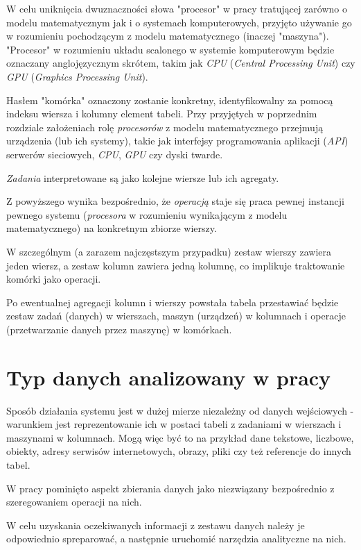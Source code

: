 \documentclass[brudnopis]{xmgr}
\begin{document}
W celu uniknięcia dwuznaczności słowa "procesor" w pracy tratującej zarówno o modelu matematycznym jak i o systemach komputerowych, przyjęto używanie go w rozumieniu pochodzącym z modelu matematycznego (inaczej "maszyna").
"Procesor" w rozumieniu układu scalonego w systemie komputerowym będzie oznaczany anglojęzycznym skrótem, takim jak \emph{CPU} (\emph{Central Processing Unit}) czy \emph{GPU} (\emph{Graphics Processing Unit}).
\medskip

Hasłem "komórka" oznaczony zostanie konkretny, identyfikowalny za pomocą indeksu wiersza i kolumny element tabeli.
Przy przyjętych w poprzednim rozdziale założeniach rolę \emph{procesorów} z modelu matematycznego przejmują urządzenia (lub ich systemy), takie jak interfejsy programowania aplikacji (\emph{API}) serwerów sieciowych, \emph{CPU}, \emph{GPU} czy dyski twarde.
\medskip

\emph{Zadania} interpretowane są jako kolejne wiersze lub ich agregaty.
\medskip

Z powyższego wynika bezpośrednio, że \emph{operacją} staje się praca pewnej instancji pewnego systemu (\emph{procesora} w rozumieniu wynikającym z modelu matematycznego) na konkretnym zbiorze wierszy.
\medskip

W szczególnym (a zarazem najczęstszym przypadku) zestaw wierszy zawiera jeden wiersz, a zestaw kolumn zawiera jedną kolumnę, co implikuje traktowanie komórki jako operacji.
\medskip

Po ewentualnej agregacji kolumn i wierszy powstała tabela przestawiać będzie zestaw zadań (danych) w wierszach, maszyn (urządzeń) w kolumnach i operacje (przetwarzanie danych przez maszynę) w komórkach.



\chapter{Typ danych analizowany w pracy}

Sposób działania systemu jest w dużej mierze niezależny od danych wejściowych - warunkiem jest reprezentowanie ich w postaci tabeli z zadaniami w wierszach i maszynami w kolumnach.
Mogą więc być to na przykład dane tekstowe, liczbowe, obiekty, adresy serwisów internetowych, obrazy, pliki czy też referencje do innych tabel.
\medskip

W pracy pominięto aspekt zbierania danych jako niezwiązany bezpośrednio z szeregowaniem operacji na nich.
\medskip

W celu uzyskania oczekiwanych informacji z zestawu danych należy je odpowiednio spreparować, a następnie uruchomić narzędzia analityczne na nich.
\medskip
\end{document}
